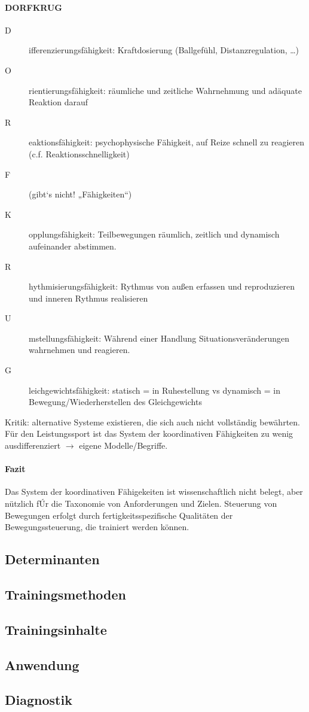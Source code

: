 \paragraph{DORFKRUG}
\begin{description}
  \item[D]ifferenzierungsfähigkeit: Kraftdosierung (Ballgefühl, Distanzregulation, \ldots)
  \item[O]rientierungsfähigkeit: räumliche und zeitliche Wahrnehmung und adäquate Reaktion darauf
  \item[R]eaktionsfähigkeit: psychophysische Fähigkeit, auf Reize schnell zu reagieren (c.f. Reaktionsschnelligkeit)
  \item[F] (gibt‘s nicht! „Fähigkeiten“)
  \item[K]opplungsfähigkeit: Teilbewegungen räumlich, zeitlich und dynamisch aufeinander abstimmen.
  \item[R]hythmisierungsfähigkeit: Rythmus von außen erfassen und reproduzieren und inneren Rythmus realisieren
  \item[U]mstellungsfähigkeit: Während einer Handlung Situationsveränderungen wahrnehmen und reagieren.
  \item[G]leichgewichtsfähigkeit: statisch = in Ruhestellung vs dynamisch = in Bewegung/Wiederherstellen des Gleichgewichts
\end{description}
Kritik: alternative Systeme existieren, die sich auch nicht vollständig bewährten.
Für den Leistungssport ist das System der koordinativen Fähigkeiten zu wenig ausdifferenziert $\rightarrow$ eigene Modelle/Begriffe.
\paragraph{Fazit} Das System der koordinativen Fähigekeiten ist wissenschaftlich nicht belegt, aber nützlich fÚr die Taxonomie von Anforderungen und Zielen. 
Steuerung von Bewegungen erfolgt durch fertigkeitsspezifische Qualitäten der Bewegungssteuerung, die trainiert werden können.

\subsection{Determinanten}

\subsection{Trainingsmethoden}

\subsection{Trainingsinhalte}

\subsection{Anwendung}

\subsection{Diagnostik}
